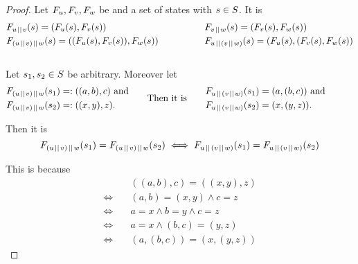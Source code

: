 \documentclass[preview]{standalone}
\begin{document}
\begin{proof}
Let $\grpfct[u], \grpfct[v], \grpfct[w]$ be \grpfctsN and \states a set of states with $\state \in \states$. It is
\begin{equation*}
	\begin{aligned}[c]
		&\grpfct[u \pll v](\state) = (\grpfct[u](\state), \grpfct[v](\state)) \\
		&\grpfct[(u \pll v) \pll w](\state) = ((\grpfct[u](\state), \grpfct[v](\state)), \grpfct[w](\state))
	\end{aligned}
	\quad\quad\quad\quad\quad
	\begin{aligned}[c]
		&\grpfct[v \pll w](\state) = (\grpfct[v](\state), \grpfct[w](\state)) \\
		&\grpfct[u \pll (v \pll w)](\state) = (\grpfct[u](\state), (\grpfct[v](\state), \grpfct[w](\state))\\
	\end{aligned}					
\end{equation*}
\\
\noindent
Let $\state_1, \state_2 \in \states$ be arbitrary. Moreover let %
\begin{equation*}
	\begin{aligned}[c]
		&\grpfct[(u \pll v) \pll w](\state_1) =: ((a,b),c) \text{ and} \\
		&\grpfct[(u \pll v) \pll w](\state_2) =: ((x, y), z) \text{.}
	\end{aligned}
	\quad\quad\text{Then it is}\quad\quad
	\begin{aligned}[c]
		&\grpfct[u \pll (v \pll w)](\state_1) = (a, (b, c)) \text{ and} \\
		&\grpfct[u \pll (v \pll w)](\state_2) = (x, (y, z)).
	\end{aligned}
	\quad\quad\quad				
\end{equation*}

\noindent
Then it is
\[
	\grpfct[(u \pll v) \pll w](\state_1) = \grpfct[(u \pll v) \pll w](\state_2) \iff \grpfct[u \pll (v \pll w)](\state_1) = \grpfct[u \pll (v \pll w)](\state_2)
\]

\noindent
This is because
\begin{align*}
	&((a, b), c) = ((x, y), z) \\
	\iff \quad &(a, b) = (x, y) \land c = z \\
	\iff \quad &a = x \land b = y \land c = z \\
	\iff \quad &a = x \land (b, c) = (y, z) \\
	\iff \quad &(a, (b, c)) = (x, (y, z))
\end{align*}
\end{proof}
\end{document}
